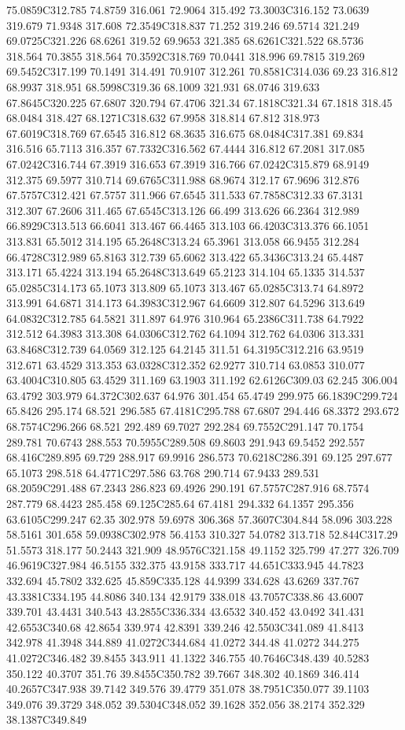 75.0859C312.785 74.8759 316.061 72.9064 315.492 73.3003C316.152 73.0639 319.679 71.9348 317.608 72.3549C318.837 71.252 319.246 69.5714 321.249 69.0725C321.226 68.6261 319.52 69.9653 321.385 68.6261C321.522 68.5736 318.564 70.3855 318.564 70.3592C318.769 70.0441 318.996 69.7815 319.269 69.5452C317.199 70.1491 314.491 70.9107 312.261 70.8581C314.036 69.23 316.812 68.9937 318.951 68.5998C319.36 68.1009 321.931 68.0746 319.633 67.8645C320.225 67.6807 320.794 67.4706 321.34 67.1818C321.34 67.1818 318.45 68.0484 318.427 68.1271C318.632 67.9958 318.814 67.812 318.973 67.6019C318.769 67.6545 316.812 68.3635 316.675 68.0484C317.381 69.834 316.516 65.7113 316.357 67.7332C316.562 67.4444 316.812 67.2081 317.085 67.0242C316.744 67.3919 316.653 67.3919 316.766 67.0242C315.879 68.9149 312.375 69.5977 310.714 69.6765C311.988 68.9674 312.17 67.9696 312.876 67.5757C312.421 67.5757 311.966 67.6545 311.533 67.7858C312.33 67.3131 312.307 67.2606 311.465 67.6545C313.126 66.499 313.626 66.2364 312.989 66.8929C313.513 66.6041 313.467 66.4465 313.103 66.4203C313.376 66.1051 313.831 65.5012 314.195 65.2648C313.24 65.3961 313.058 66.9455 312.284 66.4728C312.989 65.8163 312.739 65.6062 313.422 65.3436C313.24 65.4487 313.171 65.4224 313.194 65.2648C313.649 65.2123 314.104 65.1335 314.537 65.0285C314.173 65.1073 313.809 65.1073 313.467 65.0285C313.74 64.8972 313.991 64.6871 314.173 64.3983C312.967 64.6609 312.807 64.5296 313.649 64.0832C312.785 64.5821 311.897 64.976 310.964 65.2386C311.738 64.7922 312.512 64.3983 313.308 64.0306C312.762 64.1094 312.762 64.0306 313.331 63.8468C312.739 64.0569 312.125 64.2145 311.51 64.3195C312.216 63.9519 312.671 63.4529 313.353 63.0328C312.352 62.9277 310.714 63.0853 310.077 63.4004C310.805 63.4529 311.169 63.1903 311.192 62.6126C309.03 62.245 306.004 63.4792 303.979 64.372C302.637 64.976 301.454 65.4749 299.975 66.1839C299.724 65.8426 295.174 68.521 296.585 67.4181C295.788 67.6807 294.446 68.3372 293.672 68.7574C296.266 68.521 292.489 69.7027 292.284 69.7552C291.147 70.1754 289.781 70.6743 288.553 70.5955C289.508 69.8603 291.943 69.5452 292.557 68.416C289.895 69.729 288.917 69.9916 286.573 70.6218C286.391 69.125 297.677 65.1073 298.518 64.4771C297.586 63.768 290.714 67.9433 289.531 68.2059C291.488 67.2343 286.823 69.4926 290.191 67.5757C287.916 68.7574 287.779 68.4423 285.458 69.125C285.64 67.4181 294.332 64.1357 295.356 63.6105C299.247 62.35 302.978 59.6978 306.368 57.3607C304.844 58.096 303.228 58.5161 301.658 59.0938C302.978 56.4153 310.327 54.0782 313.718 52.844C317.29 51.5573 318.177 50.2443 321.909 48.9576C321.158 49.1152 325.799 47.277 326.709 46.9619C327.984 46.5155 332.375 43.9158 333.717 44.651C333.945 44.7823 332.694 45.7802 332.625 45.859C335.128 44.9399 334.628 43.6269 337.767 43.3381C334.195 44.8086 340.134 42.9179 338.018 43.7057C338.86 43.6007 339.701 43.4431 340.543 43.2855C336.334 43.6532 340.452 43.0492 341.431 42.6553C340.68 42.8654 339.974 42.8391 339.246 42.5503C341.089 41.8413 342.978 41.3948 344.889 41.0272C344.684 41.0272 344.48 41.0272 344.275 41.0272C346.482 39.8455 343.911 41.1322 346.755 40.7646C348.439 40.5283 350.122 40.3707 351.76 39.8455C350.782 39.7667 348.302 40.1869 346.414 40.2657C347.938 39.7142 349.576 39.4779 351.078 38.7951C350.077 39.1103 349.076 39.3729 348.052 39.5304C348.052 39.1628 352.056 38.2174 352.329 38.1387C349.849 